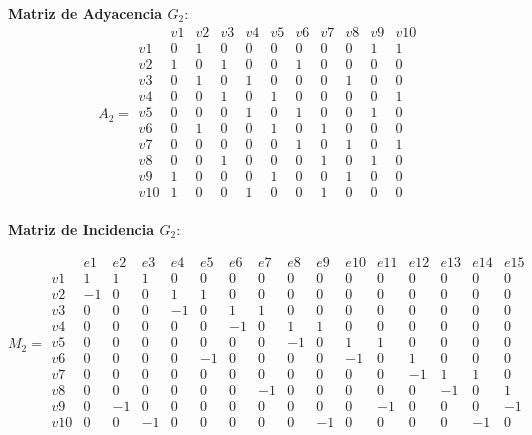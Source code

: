 \documentclass{article}
\begin{document}
\textbf{Matriz de Adyacencia \( G_2 \)}:
\[
A_2 =
\begin{array}{c|cccccccccc}
    & v1 & v2 & v3 & v4 & v5 & v6 & v7 & v8 & v9 & v10 \\
\hline
v1 & 0 & 1 & 0 & 0 & 0 & 0 & 0 & 0 & 1 & 1 \\
v2 & 1 & 0 & 1 & 0 & 0 & 1 & 0 & 0 & 0 & 0 \\
v3 & 0 & 1 & 0 & 1 & 0 & 0 & 0 & 1 & 0 & 0 \\
v4 & 0 & 0 & 1 & 0 & 1 & 0 & 0 & 0 & 0 & 1 \\
v5 & 0 & 0 & 0 & 1 & 0 & 1 & 0 & 0 & 1 & 0 \\
v6 & 0 & 1 & 0 & 0 & 1 & 0 & 1 & 0 & 0 & 0 \\
v7 & 0 & 0 & 0 & 0 & 0 & 1 & 0 & 1 & 0 & 1 \\
v8 & 0 & 0 & 1 & 0 & 0 & 0 & 1 & 0 & 1 & 0 \\
v9 & 1 & 0 & 0 & 0 & 1 & 0 & 0 & 1 & 0 & 0 \\
v10& 1 & 0 & 0 & 1 & 0 & 0 & 1 & 0 & 0 & 0 \\
\end{array}
\]

\textbf{Matriz de Incidencia \( G_2 \)}:

\setcounter{MaxMatrixCols}{20}
\[
M_2 =
\begin{array}{c|ccccccccccccccc}
    & e1 & e2 & e3 & e4 & e5 & e6 & e7 & e8 & e9 & e10 & e11 & e12 & e13 & e14 & e15 \\
\hline
v1 & 1  & 1  & 1  & 0  & 0  & 0  & 0  & 0  & 0  & 0  & 0  & 0  & 0  & 0  & 0   \\
v2 & -1 & 0  & 0  & 1  & 1  & 0  & 0  & 0  & 0  & 0  & 0  & 0  & 0  & 0  & 0   \\
v3 & 0  & 0  & 0  & -1 & 0  & 1  & 1  & 0  & 0  & 0  & 0  & 0  & 0  & 0  & 0   \\
v4 & 0  & 0  & 0  & 0  & 0  & -1 & 0  & 1  & 1  & 0  & 0  & 0  & 0  & 0  & 0   \\
v5 & 0  & 0  & 0  & 0  & 0  & 0  & 0  & -1 & 0  & 1  & 1  & 0  & 0  & 0  & 0   \\
v6 & 0  & 0  & 0  & 0  & -1 & 0  & 0  & 0  & 0  & -1 & 0  & 1  & 0  & 0  & 0   \\
v7 & 0  & 0  & 0  & 0  & 0  & 0  & 0  & 0  & 0  & 0  & 0  & -1 & 1  & 1  & 0   \\
v8 & 0  & 0  & 0  & 0  & 0  & 0  & -1 & 0  & 0  & 0  & 0  & 0  & -1 & 0  & 1   \\
v9 & 0  & -1 & 0  & 0  & 0  & 0  & 0  & 0  & 0  & 0  & -1 & 0  & 0  & 0  & -1  \\
v10& 0  & 0  & -1 & 0  & 0  & 0  & 0  & 0  & -1 & 0  & 0  & 0  & 0  & -1 & 0   \\
\end{array}
\]
\end{document}
